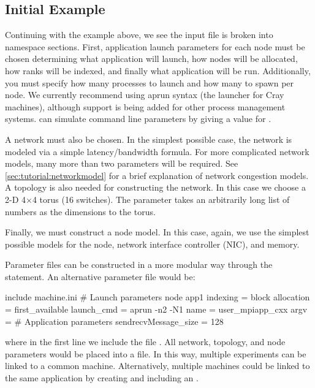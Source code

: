 \subsection{Initial Example}
\label{subsec:initialExample}
Continuing with the example above, we see the input file is broken into namespace sections. 
First, application launch parameters for each node must be chosen determining what application will launch, 
how nodes will be allocated, how ranks will be indexed, and finally what application will be run.
Additionally, you must specify how many processes to launch and how many to spawn per node.
We currently recommend using aprun syntax (the launcher for Cray machines),
although support is being added for other process management systems.
\sstmacro can simulate command line parameters by giving a value for .

A network must also be chosen.
In the simplest possible case, the network is modeled via a simple latency/bandwidth formula.
For more complicated network models, many more than two parameters will be required.
See \ref{sec:tutorial:networkmodel} for a brief explanation of \sstmacro network congestion models.
A topology is also needed for constructing the network.
In this case we choose a 2-D 4$\times$4 torus (16 switches).  The 
parameter takes an arbitrarily long list of numbers as the dimensions to the torus.

Finally, we must construct a node model.
In this case, again, we use the simplest possible models for the node,
network interface controller (NIC), and memory.

Parameter files can be constructed in a more modular way through the  statement.
An alternative parameter file would be:

\begin{ViFile}
include machine.ini
# Launch parameters
node {
 app1 {
  indexing = block
  allocation = first_available
  launch_cmd = aprun -n2 -N1
  name = user_mpiapp_cxx
  argv = 
  # Application parameters
  sendrecvMessage_size = 128
 }
}

\end{ViFile}
where in the first line we include the file .
All network, topology, and node parameters would be placed into a  file.
In this way, multiple experiments can be linked to a common machine.
Alternatively, multiple machines could be linked to the same application by creating and including an .
